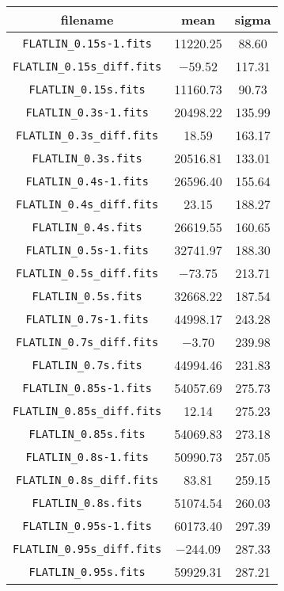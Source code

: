 \begin{table}[ht]
\centering
\begin{tabular}{ccc}
\toprule
filename & mean & sigma \\ 
\midrule 
\verb|FLATLIN_0.15s-1.fits| & \num{11220.25} & \num{88.60}\\
\verb|FLATLIN_0.15s_diff.fits| & \num{-59.52} & \num{117.31}\\
\verb|FLATLIN_0.15s.fits| & \num{11160.73} & \num{90.73}\\
\verb|FLATLIN_0.3s-1.fits| & \num{20498.22} & \num{135.99}\\
\verb|FLATLIN_0.3s_diff.fits| & \num{18.59} & \num{163.17}\\
\verb|FLATLIN_0.3s.fits| & \num{20516.81} & \num{133.01}\\
\verb|FLATLIN_0.4s-1.fits| & \num{26596.40} & \num{155.64}\\
\verb|FLATLIN_0.4s_diff.fits| & \num{23.15} & \num{188.27}\\
\verb|FLATLIN_0.4s.fits| & \num{26619.55} & \num{160.65}\\
\verb|FLATLIN_0.5s-1.fits| & \num{32741.97} & \num{188.30}\\
\verb|FLATLIN_0.5s_diff.fits| & \num{-73.75} & \num{213.71}\\
\verb|FLATLIN_0.5s.fits| & \num{32668.22} & \num{187.54}\\
\verb|FLATLIN_0.7s-1.fits| & \num{44998.17} & \num{243.28}\\
\verb|FLATLIN_0.7s_diff.fits| & \num{-3.70} & \num{239.98}\\
\verb|FLATLIN_0.7s.fits| & \num{44994.46} & \num{231.83}\\
\verb|FLATLIN_0.85s-1.fits| & \num{54057.69} & \num{275.73}\\
\verb|FLATLIN_0.85s_diff.fits| & \num{12.14} & \num{275.23}\\
\verb|FLATLIN_0.85s.fits| & \num{54069.83} & \num{273.18}\\
\verb|FLATLIN_0.8s-1.fits| & \num{50990.73} & \num{257.05}\\
\verb|FLATLIN_0.8s_diff.fits| & \num{83.81} & \num{259.15}\\
\verb|FLATLIN_0.8s.fits| & \num{51074.54} & \num{260.03}\\
\verb|FLATLIN_0.95s-1.fits| & \num{60173.40} & \num{297.39}\\
\verb|FLATLIN_0.95s_diff.fits| & \num{-244.09} & \num{287.33}\\
\verb|FLATLIN_0.95s.fits| & \num{59929.31} & \num{287.21}\\

\end{tabular}
\end{table}
